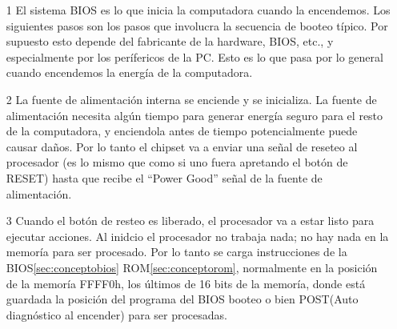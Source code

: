 \documentclass[12pt,oneside,a4paper]{article}
\begin{document}
	\begin{enumerate}
		\item[1]El sistema BIOS es lo que inicia la computadora cuando la
			encendemos.  Los siguientes pasos son los pasos que involucra la
			secuencia de booteo típico.  Por supuesto esto depende del
			fabricante de la hardware, BIOS, etc., y especialmente por los
			perífericos de la PC. Esto es lo que pasa por lo general cuando
			encendemos la energía de la computadora.

	
		\item[2] La fuente de alimentación interna se enciende y se inicializa.
			La fuente de alimentación necesita algún tiempo para generar
			energía seguro para el resto de la computadora, y enciendola antes
			de tiempo potencialmente puede causar daños. Por lo tanto el
			chipset va a enviar una señal de reseteo al procesador (es lo mismo
			que como si uno fuera apretando el botón de RESET) hasta que recibe
			el ``Power Good'' señal de la fuente de alimentación.

	
		\item[3] Cuando el botón de resteo es liberado, el procesador va a
			estar listo para ejecutar acciones.  Al inidcio el procesador no
			trabaja nada; no hay nada en la memoría para ser procesado.  Por lo
			tanto se carga instrucciones de la BIOS\ref{sec:conceptobios}
			ROM\ref{sec:conceptorom}, normalmente en la posición de la memoría
			FFFF0h, los últimos de 16 bits de la memoría, donde está guardada
			la posición del programa del BIOS booteo o bien POST(Auto
			diagnóstico al encender) para ser procesadas.


\end{enumerate}
\end{document}
